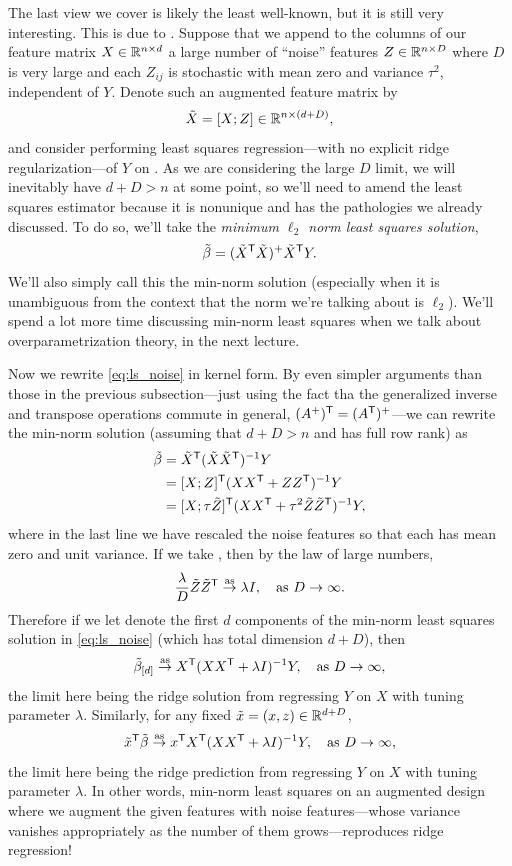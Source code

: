 \documentclass{article}
\begin{document}
The last view we cover is likely the least well-known, but it is still very 
interesting. This is due to \citet{kobak2020optimal}. Suppose that we append to
the columns of our feature matrix $X \in \mathbb{R}^{n \times d}$ a large number of
``noise'' features $Z \in \mathbb{R}^{n \times D}$ where $D$ is very large and each
$Z_{ij}$ is stochastic with mean zero and variance $\tau^2$, independent of
$Y$. Denote such an augmented feature matrix by
\[
\tilde X = [X; Z] \in \mathbb{R}^{n \times (d+D)},
\]
and consider performing least squares regression---with no explicit ridge
regularization---of $Y$ on . As we are considering the large
$D$ limit, we will inevitably have $d+D > n$ at some point, so we'll need to
amend the least squares estimator because it is nonunique and has the
pathologies we already discussed. To do so, we'll take the \emph{minimum 
  $\ell_2$ norm least squares solution}, 
\begin{equation}
\label{eq:ls_noise}
\tilde\beta = (\tilde X^{\mathsf{T}} \tilde X)^+ \tilde X^{\mathsf{T}} Y.
\end{equation}
We'll also simply call this the min-norm solution (especially when it is
unambiguous from the context that the norm we're talking about is
$\ell_2$). We'll spend a lot more time discussing min-norm least squares when we
talk about overparametrization theory, in the next lecture.  

Now we rewrite \eqref{eq:ls_noise} in kernel form. By even simpler arguments
than those in the previous subsection---just using the fact tha the generalized 
inverse and transpose operations commute in general, $(A^+)^{\mathsf{T}} = (A^{\mathsf{T}})^+$---we 
can rewrite the min-norm solution (assuming that $d+D > n$ and  has full row rank) as  
\begin{align*}
\tilde\beta &= \tilde X^{\mathsf{T}} (\tilde X \tilde X^{\mathsf{T}})^{-1} Y \\
&= [X; Z]^{\mathsf{T}} (XX^{\mathsf{T}} + ZZ^{\mathsf{T}})^{-1} Y \\
&= [X; \tau \tilde Z]^{\mathsf{T}} (XX^{\mathsf{T}} + \tau^2 \tilde Z \tilde Z^{\mathsf{T}})^{-1} Y,  
\end{align*}
where in the last line we have rescaled the noise features so that each
 has mean zero and unit variance. If
we take , then by the law of large numbers, 
\[
\frac{\lambda}{D} \tilde Z \tilde Z^{\mathsf{T}} \overset{\mathrm{as}}{\to} \lambda I, \quad \text{as $D \to
  \infty$}. 
\]
Therefore if we let \smash{$\tilde \beta_{[d]}$} denote the first $d$ components
of the min-norm least squares solution in \eqref{eq:ls_noise} (which has total
dimension $d+D$), then   
\[
\tilde \beta_{[d]} \overset{\mathrm{as}}{\to} X^{\mathsf{T}} (XX^{\mathsf{T}} + \lambda I)^{-1} Y, \quad \text{as $D \to 
  \infty$},
\]
the limit here being the ridge solution from regressing $Y$ on $X$ with tuning
parameter $\lambda$. Similarly, for any fixed $\tilde x = (x, z) \in \mathbb{R}^{d+D}$,  
\[
\tilde x^{\mathsf{T}} \tilde \beta \overset{\mathrm{as}}{\to} x^{\mathsf{T}} X^{\mathsf{T}} (XX^{\mathsf{T}} + \lambda I)^{-1} Y, \quad
\text{as $D \to \infty$},
\]
the limit here being the ridge prediction from regressing $Y$ on $X$ with tuning
parameter $\lambda$. In other words, min-norm least squares on an augmented
design where we augment the given features with noise features---whose variance
vanishes appropriately as the number of them grows---reproduces ridge
regression! 
\end{document}
